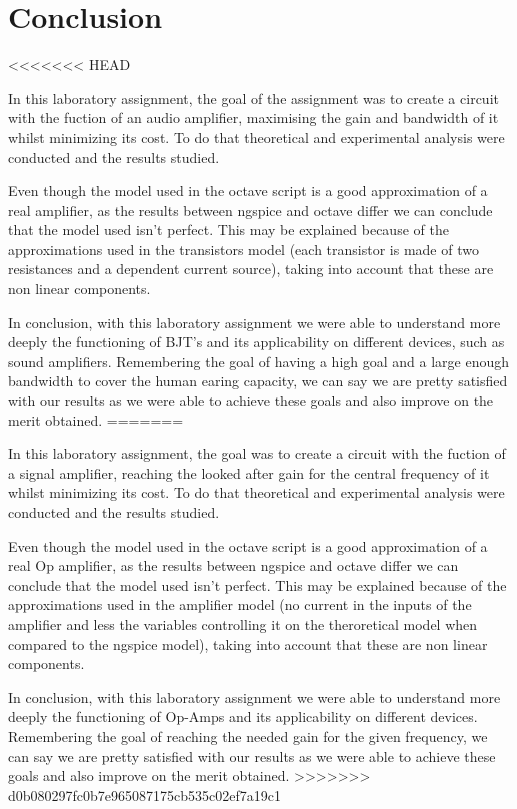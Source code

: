 \section{Conclusion}
\label{sec:conclusion}

<<<<<<< HEAD
\par In this laboratory assignment, the goal of the assignment was to create a circuit with the fuction of an audio amplifier, maximising the gain and bandwidth of it whilst minimizing its cost. To do that theoretical and experimental analysis were conducted and the results studied.

\par Even though the model used in the octave script is a good approximation of a real amplifier, as the results between ngspice and octave differ  we can conclude that the model used isn't perfect. This may be explained because of the approximations used in the transistors model (each transistor is made of two resistances and a dependent current source), taking into account that these are non linear components. 
 
\par In conclusion, with this laboratory assignment we were able to understand more deeply the functioning of BJT's and its applicability on different devices, such as sound amplifiers. Remembering the goal of having a high goal and a large enough bandwidth to cover the human earing capacity, we can say we are pretty satisfied with our results as we were able to achieve these goals and also improve on the merit obtained.
=======
\par In this laboratory assignment, the goal was to create a circuit with the fuction of a signal amplifier, reaching the looked after gain for the central frequency of it whilst minimizing its cost. To do that theoretical and experimental analysis were conducted and the results studied.

\par Even though the model used in the octave script is a good approximation of a real Op amplifier, as the results between ngspice and octave differ  we can conclude that the model used isn't perfect. This may be explained because of the approximations used in the amplifier model (no current in the inputs of the amplifier and less the variables controlling it on the theroretical model when compared to the ngspice model), taking into account that these are non linear components. 
 
\par In conclusion, with this laboratory assignment we were able to understand more deeply the functioning of Op-Amps and its applicability on different devices. Remembering the goal of reaching the needed gain for the given frequency, we can say we are pretty satisfied with our results as we were able to achieve these goals and also improve on the merit obtained.
>>>>>>> d0b080297fc0b7e965087175cb535c02ef7a19c1








